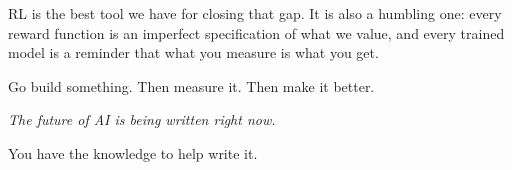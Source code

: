 \begin{chapterenv}
RL is the best tool we have for closing that gap. It is also a humbling one: every reward function is an imperfect specification of what we value, and every trained model is a reminder that what you measure is what you get.

Go build something. Then measure it. Then make it better.

\begin{center}
\vspace{1.5cm}
{\large\itshape
The future of AI is being written right now.

You have the knowledge to help write it.}
\vspace{1.5cm}
\end{center}

\end{chapterenv}
